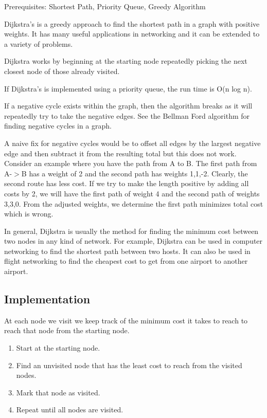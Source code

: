 \documentclass[11pt,oneside]{book}
\begin{document}
Prerequisites:  Shortest Path, Priority Queue, Greedy Algorithm

Dijkstra's is a greedy approach to find the shortest path in a graph with positive weights. It has many useful applications in networking and it can be extended to a variety of problems.

Dijkstra works by beginning at the starting node repeatedly picking the next closest node of those already visited.

If Dijkstra's is implemented using a priority queue, the run time is O(n log n).

If a negative cycle exists within the graph, then the algorithm breaks as it will repeatedly try to take the negative edges. See the Bellman Ford algorithm for finding negative cycles in a graph.

A naive fix for negative cycles would be to offset all edges by the largest negative edge and then subtract it from the resulting total but this does not work. Consider an example where you have the path from A to B. The first path from A-$>$B has a weight of 2 and the second path has weights 1,1,-2. Clearly, the second route has less cost. If we try to make the length positive by adding all costs by 2, we will have the first path of weight 4 and the second path of weights 3,3,0. From the adjusted weights, we determine the first path minimizes total cost which is wrong.

In general, Dijkstra is usually the method for finding the minimum cost between two nodes in any kind of network. For example, Dijkstra can be used in computer networking to find the shortest path between two hosts. It can also be used in flight networking to find the cheapest cost to get from one airport to another airport.

\subsection{Implementation}

At each node we visit we keep track of the minimum cost it takes to reach to reach that node from the starting node.

\begin{enumerate}
\item Start at the starting node.
\item Find an unvisited node that has the least cost to reach from the visited nodes.
\item Mark that node as visited.
\item Repeat until all nodes are visited.
\end{enumerate}
\end{document}
